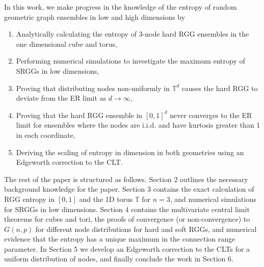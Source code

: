 \documentclass{article}
\newcommand{\tti}{\rightarrow\infty}
\begin{document}
In this work, we make progress in the knowledge of the entropy of random geometric graph ensembles in low and high dimensions by
\begin{enumerate}
    \item Analytically calculating the entropy of 3-node hard RGG ensembles in the one dimensional cube and torus,
    \item Performing numerical simulations to investigate the maximum entropy of SRGGs in low dimensions,
    \item Proving that distributing nodes non-uniformly in $\mathbb{T}^d$ causes the hard RGG to deviate from the ER limit as $d\tti$, 
    \item Proving that the hard RGG ensemble in $[0,1]^d$ never converges to the ER limit for ensembles where the nodes are i.i.d. and have kurtosis greater than 1 in each coordinate, 
    \item  Deriving the scaling of entropy in dimension in both geometries using an Edgeworth correction to the CLT.  
\end{enumerate} 
The rest of the paper is structured as follows. Section 2 outlines the necessary background knowledge for the paper. Section 3 contains the exact calculation of RGG entropy in $[0,1]$ and the 1D torus $\mathbb{T}$ for $n=3$, and numerical simulations for SRGGs in low dimensions. Section 4 contains the multivariate central limit theorems for cubes and tori, the proofs of convergence (or non-convergence) to $G(n,p)$ for different node distributions for hard and soft RGGs, and numerical evidence that the entropy has a unique maximum in the connection range parameter. In Section 5 we develop an Edgeworth correction to the CLTs for a uniform distribution of nodes, and finally conclude the work in Section 6. 
\end{document}

